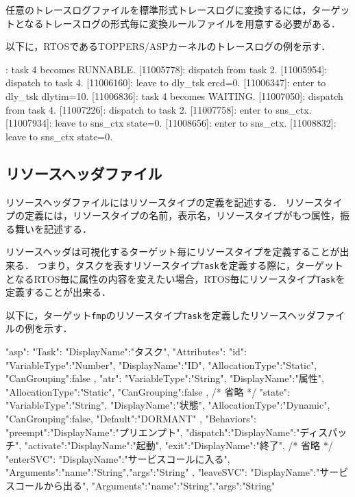 任意のトレースログファイルを標準形式トレースログに変換するには，ターゲットとなるトレースログの形式毎に変換ルールファイルを用意する必要がある．

以下に，RTOSであるTOPPERS/ASPカーネルのトレースログの例を示す．

\begin{File}
[11005239]: task 4 becomes RUNNABLE.
[11005778]: dispatch from task 2.
[11005954]: dispatch to task 4.
[11006160]: leave to dly_tsk ercd=0.
[11006347]: enter to dly_tsk dlytim=10.
[11006836]: task 4 becomes WAITING.
[11007050]: dispatch from task 4.
[11007226]: dispatch to task 2.
[11007758]: enter to sns_ctx.
[11007934]: leave to sns_ctx state=0.
[11008656]: enter to sns_ctx.
[11008832]: leave to sns_ctx state=0.
\end{File}

\subsection{リソースヘッダファイル}
\label{subsec:reshFile}

リソースヘッダファイルにはリソースタイプの定義を記述する．
リソースタイプの定義には，リソースタイプの名前，表示名，リソースタイプがもつ属性，振る舞いを記述する．

リソースヘッダは可視化するターゲット毎にリソースタイプを定義することが出来る．
つまり，タスクを表すリソースタイプ\verb|Task|を定義する際に，ターゲットとなるRTOS毎に属性の内容を変えたい場合，RTOS毎にリソースタイプ\verb|Task|を定義することが出来る．

以下に，ターゲット\verb|fmp|のリソースタイプ\verb|Task|を定義したリソースヘッダファイルの例を示す．

\begin{File}
{
  "asp":{
    "Task":{
      "DisplayName":"タスク",
      "Attributes":{
        "id":{
          "VariableType":"Number",
          "DisplayName":"ID",
          "AllocationType":"Static",
          "CanGrouping":false
        },
        "atr":{
          "VariableType":"String",
          "DisplayName":"属性",
          "AllocationType":"Static",
          "CanGrouping":false
        },
        /* 省略 */
        "state":{
          "VariableType":"String",
          "DisplayName":"状態",
          "AllocationType":"Dynamic",
          "CanGrouping":false,
          "Default":"DORMANT"
        }
      },
      "Behaviors":{
        "preempt":{"DisplayName":"プリエンプト"},
        "dispatch":{"DisplayName":"ディスパッチ"},
        "activate":{"DisplayName":"起動"},
        "exit":{"DisplayName":"終了"},
        /* 省略 */
        "enterSVC":{
          "DisplayName":"サービスコールに入る",
          "Arguments":{"name":"String","args":"String"}
        },
        "leaveSVC":{
          "DisplayName":"サービスコールから出る",
          "Arguments":{"name":"String","args":"String"}
        }
      }
    }
  }
}
\end{File}

